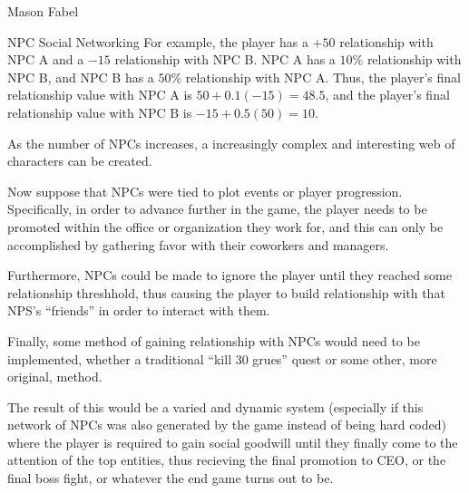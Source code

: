 \documentclass[12pt]{report}
\begin{document}
\begin{section}{Mason Fabel}
\begin{subsection}{NPC Social Networking}
For example, the player has a $+50$ relationship with NPC A and a $-15$
relationship with NPC B. NPC A has a $10\%$ relationship with NPC B, and
NPC B has a $50\%$ relationship with NPC A. Thus, the player's final
relationship value with NPC A is $50+0.1(-15)=48.5$, and the player's
final relationship value with NPC B is $-15+0.5(50)=10$.

As the number of NPCs increases, a increasingly complex and interesting web
of characters can be created.

Now suppose that NPCs were tied to plot events or player progression.
Specifically, in order to advance further in the game, the player needs
to be promoted within the office or organization they work for, and this
can only be accomplished by gathering favor with their coworkers and
managers.

Furthermore, NPCs could be made to ignore the player until they reached
some relationship threshhold, thus causing the player to build relationship
with that NPS's ``friends'' in order to interact with them.

Finally, some method of gaining relationship with NPCs would need to be
implemented, whether a traditional ``kill 30 grues'' quest or some other,
more original, method.

The result of this would be a varied and dynamic system (especially if this
network of NPCs was also generated by the game instead of being hard coded)
where the player is required to gain social goodwill until they finally
come to the attention of the top entities, thus recieving the final
promotion to CEO, or the final boss fight, or whatever the end game turns
out to be.
\end{subsection}

\end{section}
\end{document}
